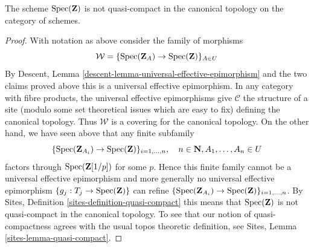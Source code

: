 \begin{lemma}
\label{lemma-Z-not-quasi-compact}
The scheme $\mathop{\mathrm{Spec}}(\mathbf{Z})$ is not quasi-compact
in the canonical topology on the category of schemes.
\end{lemma}

\begin{proof}
With notation as above consider the family of morphisms
$$
\mathcal{W} = \{\mathop{\mathrm{Spec}}(\mathbf{Z}_A) \to \mathop{\mathrm{Spec}}(\mathbf{Z})\}_{A \in U}
$$
By Descent, Lemma \ref{descent-lemma-universal-effective-epimorphism}
and the two claims proved above
this is a universal effective epimorphism.
In any category with fibre products, the universal effective epimorphisms
give $\mathcal{C}$ the structure of a site (modulo some set theoretical
issues which are easy to fix) defining the canonical topology.
Thus $\mathcal{W}$ is a covering for the canonical topology.
On the other hand, we have seen above that any finite subfamily
$$
\{\mathop{\mathrm{Spec}}(\mathbf{Z}_{A_i}) \to \mathop{\mathrm{Spec}}(\mathbf{Z})\}_{i = 1, \ldots, n},\quad
n \in \mathbf{N}, A_1, \ldots, A_n \in U
$$
factors through $\mathop{\mathrm{Spec}}(\mathbf{Z}[1/p])$ for some $p$.
Hence this finite family cannot be a universal effective epimorphism
and more generally no universal effective epimorphism
$\{g_j : T_j \to \mathop{\mathrm{Spec}}(\mathbf{Z})\}$ can refine
$\{\mathop{\mathrm{Spec}}(\mathbf{Z}_{A_i}) \to \mathop{\mathrm{Spec}}(\mathbf{Z})\}_{i = 1, \ldots, n}$.
By Sites, Definition \ref{sites-definition-quasi-compact}
this means that $\mathop{\mathrm{Spec}}(\mathbf{Z})$ is not quasi-compact
in the canonical topology. To see that our notion of quasi-compactness
agrees with the usual topos theoretic definition, see
Sites, Lemma \ref{sites-lemma-quasi-compact}.
\end{proof}













